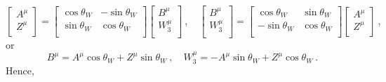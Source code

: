    \begin{equation*}
        \begin{bmatrix}
            A^\mu \\ Z^\mu \\
        \end{bmatrix} = \begin{bmatrix}
            \cos \theta_W & - \sin \theta_W \\
            \sin \theta_W & \cos \theta_W \\
        \end{bmatrix} \begin{bmatrix}
            B^\mu \\ W^\mu_3 \\
        \end{bmatrix} ~, \quad \begin{bmatrix}
            B^\mu \\ W^\mu_3 \\
        \end{bmatrix} = \begin{bmatrix}
            \cos \theta_W & \sin \theta_W \\
            - \sin \theta_W & \cos \theta_W \\
        \end{bmatrix} \begin{bmatrix}
            A^\mu \\ Z^\mu \\
        \end{bmatrix} ~,
    \end{equation*}
    or 
    \begin{equation*}
        B^\mu = A^\mu \cos \theta_W + Z^\mu \sin \theta_W ~, \quad W^\mu_3 = - A^\mu \sin \theta_W + Z^\mu \cos \theta_W ~.
    \end{equation*}
    Hence, 
